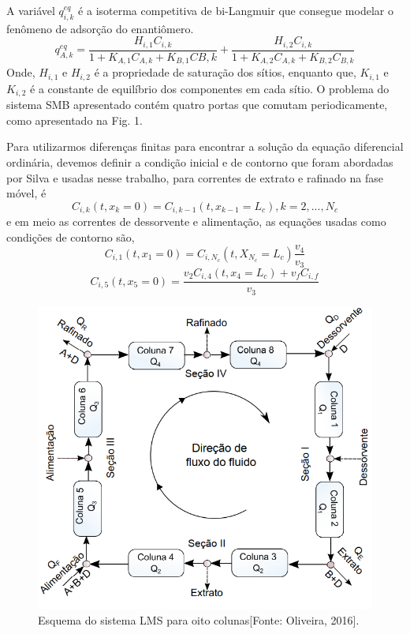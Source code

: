 \documentclass[por]{Template_SBEF}
\begin{document}
A variável  $q_{i,k}^{eq}$  é a isoterma competitiva de bi-Langmuir que consegue modelar o fenômeno de adsorção do enantiômero.
\begin{equation}
q_{A,k}^{eq} = \frac{H_{i,1} C_{i,k}}{1+K_{A,1} C_{A,k} + K_{B,1} C{B,k}}+\frac{H_{i,2} C_{i,k}}{1+K_{A,2} C_{A,k} + K_{B,2} C_{B,k}}
\end{equation}
Onde, $H_{i,1}$ e $H_{i,2}$ é a propriedade de saturação dos sítios, enquanto que, $K_{i,1}$ e $K_{i,2}$ é a constante de equilíbrio dos componentes em cada sítio.
O problema do sistema SMB apresentado contém quatro portas que comutam periodicamente, como apresentado na Fig. 1.

Para utilizarmos diferenças finitas para encontrar a solução da equação diferencial ordinária, devemos definir a condição inicial e de contorno que foram abordadas por Silva \cite{silva_mest} e usadas nesse trabalho, para correntes de extrato e rafinado na fase móvel, é
\begin{equation}
C_{i,k}(t,x_k = 0) = C_{i,k-1}(t, x_{k-1} = L_c), k = 2, ... , N_c
\end{equation}
e em meio as correntes de dessorvente e alimentação, as equações usadas como condições de contorno são,
\begin{equation}
C_{i,1}(t,x_1 = 0) = C_{i,N_c}(t,X_{N_c} = L_c) \frac{v_4}{v_3}
\end{equation}
\begin{equation}
C_{i,5}(t,x_5 = 0) = \frac{v_2 C_{i,4}(t,x_4 = L_c) + v_fC_{i,f}}{v_3} 
\end{equation}

\begin{figure}[H] 
 \centering
  \includegraphics[width=.8\columnwidth]{Arquivos/figura1.png} 
 \caption{Esquema do sistema LMS para oito colunas[Fonte: Oliveira, 2016].} \label{fig-1}
\end{figure}
\end{document}
